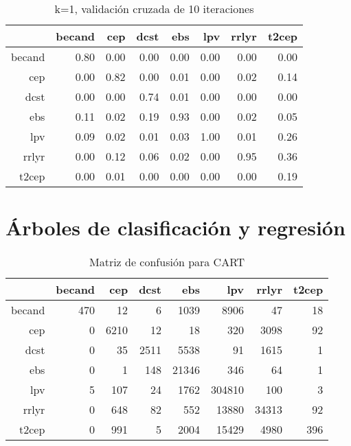 \documentclass[letterpaper,12pt]{book}
\begin{document}
\begin{table}[ht]
\centering
\begin{tabular}{rrrrrrrr}
  \hline
 & becand & cep & dcst & ebs & lpv & rrlyr & t2cep \\ 
  \hline
becand & 0.80 & 0.00 & 0.00 & 0.00 & 0.00 & 0.00 & 0.00 \\ 
  cep & 0.00 & 0.82 & 0.00 & 0.01 & 0.00 & 0.02 & 0.14 \\ 
  dcst & 0.00 & 0.00 & 0.74 & 0.01 & 0.00 & 0.00 & 0.00 \\ 
  ebs & 0.11 & 0.02 & 0.19 & 0.93 & 0.00 & 0.02 & 0.05 \\ 
  lpv & 0.09 & 0.02 & 0.01 & 0.03 & 1.00 & 0.01 & 0.26 \\ 
  rrlyr & 0.00 & 0.12 & 0.06 & 0.02 & 0.00 & 0.95 & 0.36 \\ 
  t2cep & 0.00 & 0.01 & 0.00 & 0.00 & 0.00 & 0.00 & 0.19 \\ 
   \hline
\end{tabular}
\caption{k=1, validación cruzada de 10 iteraciones} 
\label{table:cmCvKnn}
\end{table}

\section{Árboles de clasificación y regresión}
\begin{table}[ht]
\centering
\begin{tabular}{rrrrrrrr}
  \hline
 & becand & cep & dcst & ebs & lpv & rrlyr & t2cep \\ 
  \hline
becand & 470 &  12 &   6 & 1039 & 8906 &  47 &  18 \\ 
  cep &   0 & 6210 &  12 &  18 & 320 & 3098 &  92 \\ 
  dcst &   0 &  35 & 2511 & 5538 &  91 & 1615 &   1 \\ 
  ebs &   0 &   1 & 148 & 21346 & 346 &  64 &   1 \\ 
  lpv &   5 & 107 &  24 & 1762 & 304810 & 100 &   3 \\ 
  rrlyr &   0 & 648 &  82 & 552 & 13880 & 34313 &  92 \\ 
  t2cep &   0 & 991 &   5 & 2004 & 15429 & 4980 & 396 \\ 
   \hline
\end{tabular}
\caption{Matriz de confusión para CART} 
\label{cuadro:cmCart}
\end{table}
\end{document}
